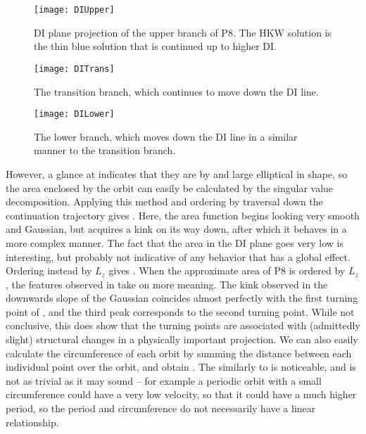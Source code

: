 \begin{figure}[h]
\texttt{[image: DIUpper]}
\caption{DI plane projection of the upper branch of P8. The HKW solution is the thin blue solution that is continued up to higher DI.}\label{fig:DIUpper}
\end{figure}

\begin{figure}[h]
\texttt{[image: DITrans]}
\caption{The transition branch, which continues to move down the DI line.  }\label{fig:DITrans}
\end{figure}

\begin{figure}[h]
\texttt{[image: DILower]}
\caption{The lower branch, which moves down the DI line in a similar manner to the transition branch.}\label{fig:DILower}
\end{figure}

However, a glance at  indicates that they are by and large elliptical in shape, so the area enclosed by the orbit can easily be calculated by the singular value decomposition. Applying this method and ordering by traversal down the continuation trajectory gives . Here, the area function begins looking very smooth and Gaussian, but acquires a kink on its way down, after which it behaves in a more complex manner. The fact that the area in the DI plane goes very low is interesting, but probably not indicative of any behavior that has a global effect. Ordering instead by $L_z$ gives . When the approximate area of P8 is ordered by $L_z$, the features observed in  take on more meaning. The kink observed in the downwards slope of the Gaussian coincides almost perfectly with the first turning point of , and the third peak corresponds to the second turning point. While not conclusive, this does show that the turning points are associated with (admittedly slight) structural changes in a physically important projection.  We can also easily calculate the circumference of each orbit by summing the distance between each individual point over the orbit, and obtain . The similarly to  is noticeable, and is not as trivial as it may sound -- for example a periodic orbit with a small circumference could have a very low velocity, so that it could have a much higher period, so the period and circumference do not necessarily have a linear relationship. \\

